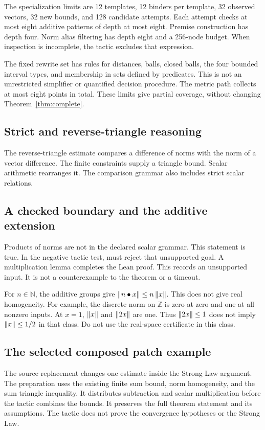 The specialization limits are 12 templates, 12 binders per template, 32 observed vectors, 32 new bounds, and 128 candidate attempts.
Each attempt checks at most eight additive patterns of depth at most eight.
Premise construction has depth four.
Norm alias filtering has depth eight and a 256-node budget.
When inspection is incomplete, the tactic excludes that expression.

The fixed rewrite set has rules for distances, balls, closed balls, the four bounded interval types, and membership in sets defined by predicates.
This is not an unrestricted simplifier or quantified decision procedure.
The metric path collects at most eight points in total.
These limits give partial coverage, without changing Theorem~\ref{thm:complete}.

\subsection{Strict and reverse-triangle reasoning}
The reverse-triangle estimate compares a difference of norms with the norm of a vector difference.
The finite constraints supply a triangle bound.
Scalar arithmetic rearranges it.
The comparison grammar also includes strict scalar relations.


\subsection{A checked boundary and the additive extension}
Products of norms are not in the declared scalar grammar.
This statement is true.
In the negative tactic test, \NA{} must reject that unsupported goal.
A multiplication lemma completes the Lean proof.
This records an unsupported input.
It is not a counterexample to the theorem or a timeout.


For $n\in\mathbb N$, the additive groups give $\left\lVert n\mathbin{\bullet}x\right\rVert\le n\left\lVert x\right\rVert$.
This does not give real homogeneity.
For example, the discrete norm on $\mathbb Z$ is zero at zero and one at all nonzero inputs.
At $x=1$, $\left\lVert x\right\rVert$ and $\left\lVert2x\right\rVert$ are one.
Thus $\left\lVert2x\right\rVert\le1$ does not imply $\left\lVert x\right\rVert\le1/2$ in that class.
Do not use the real-space certificate in this class.

\subsection{The selected composed patch example}
\begingroup\raggedright

\par\endgroup
The source replacement changes one estimate inside the Strong Law argument.
The preparation uses the existing finite sum bound, norm homogeneity, and the sum triangle inequality.
It distributes subtraction and scalar multiplication before the tactic combines the bounds.
It preserves the full theorem statement and its assumptions.
The tactic does not prove the convergence hypotheses or the Strong Law.
